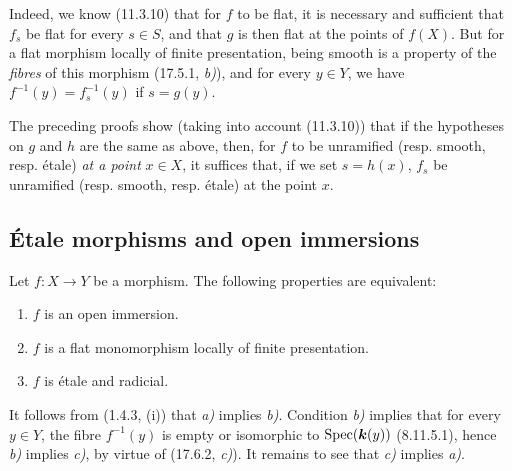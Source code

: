 Indeed, we know (11.3.10) that for $f$ to be flat, it is necessary and sufficient that $f_s$ be flat for every $s\in S$, and that $g$ is then flat at the points of $f(X)$. But for a flat morphism locally of finite presentation, being smooth is a property of the \emph{fibres} of this morphism (17.5.1, \emph{b)}), and for every $y\in Y$, we have $f^{-1}(y)=f_s^{-1}(y)$ if $s=g(y)$.

\begin{remark}[17.8.3]
\label{IV.17.8.3}
The preceding proofs show (taking into account (11.3.10)) that if the hypotheses on $g$ and $h$ are the same as above, then, for $f$ to be unramified (resp. smooth, resp. étale) \emph{at a point} $x\in X$, it suffices that, if we set $s=h(x)$, $f_s$ be unramified (resp. smooth, resp. étale) at the point $x$.
\end{remark}

\subsection{Étale morphisms and open immersions}
\label{IV.17.9}

\begin{theorem}[17.9.1]
\label{IV.17.9.1}
Let $f:X\to Y$ be a morphism. The following properties are equivalent:
\begin{enumerate}
  \item[\textup{a)}] $f$ is an open immersion.
  \item[\textup{b)}] $f$ is a flat monomorphism locally of finite presentation.
  \item[\textup{c)}] $f$ is étale and radicial.
\end{enumerate}
\end{theorem}

It follows from (1.4.3, (i)) that \emph{a)} implies \emph{b)}. Condition \emph{b)} implies that for every $y\in Y$, the fibre $f^{-1}(y)$ is empty or isomorphic to $\operatorname{Spec}(\boldsymbol{k}(y))$ (8.11.5.1), hence \emph{b)} implies \emph{c)}, by virtue of (17.6.2, \emph{c)}). It remains to see that \emph{c)} implies \emph{a)}.

